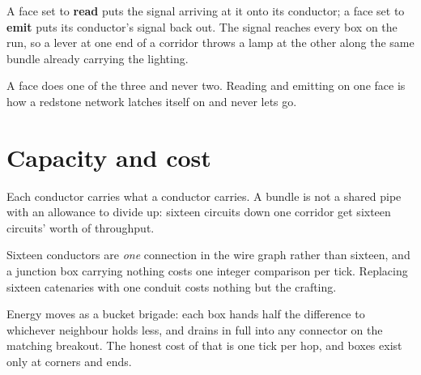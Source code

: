 A face set to \textbf{read} puts the signal arriving at it onto its conductor; a face set to
\textbf{emit} puts its conductor's signal back out. The signal reaches every box on the run, so a
lever at one end of a corridor throws a lamp at the other along the same bundle already carrying the
lighting.

A face does one of the three and never two. Reading and emitting on one face is how a redstone
network latches itself on and never lets go.

\section{Capacity and cost}

Each conductor carries what a conductor carries. A bundle is not a shared pipe with an allowance to
divide up: sixteen circuits down one corridor get sixteen circuits' worth of throughput.

Sixteen conductors are \emph{one} connection in the wire graph rather than sixteen, and a junction
box carrying nothing costs one integer comparison per tick. Replacing sixteen catenaries with one
conduit costs nothing but the crafting.

Energy moves as a bucket brigade: each box hands half the difference to whichever neighbour holds
less, and drains in full into any connector on the matching breakout. The honest cost of that is one
tick per hop, and boxes exist only at corners and ends.
